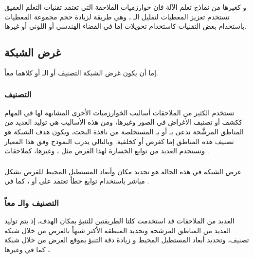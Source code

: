 \subsubsection{}
و كغيرها من نماذج تعلم الآلة فإن خوارزميات الملاحقة التي تعتمد تقنيات التعلم العميق تستخدم تعزيز المعطيات
 لتقليل الـ
،
 وهي طريقة لزيادة حجم مجموعة المعطيات باستخدام بعض التقنيات كاستخدام تحويلات إما في الفضاء الهندسي أو اللوني أو غيرها.
\subsection{غرض الشبكة}
إما أن يكون غرض الشبكة التصنيف 
 أو الـ 
 أو كلاهما معاً.

\subsubsection{التصنيف}
تستخدم الكثير من  الملاحقات أساليب الخوارزميات الأخرى المشابهة لها في  المهام ككشف أو تصنيف الأغراض في الصور وغيرها، ومن هذه الأساليب هي توليد العديد من المناطق المرشَّحة تدعى بـ
أو بـ
 المستخلصة من نافذة البحث، ويكون هدف الشبكة هو تصنيف هذه المناطق إما كغرض أو كخلفية. وبالتالي يدرب النموذج وفق هذا المعيار وتستخدم العديد من توابع الخسارة لهذا الغرض مثل 
،
وغيرها، كملاحقات 
.
\subsubsection{
}
غرض الشبكة في هذه الحالة هو تحديد مكان وأبعاد المستطيل المحيط للغرض بشكل مباشر باستخدام توابع خطأ تعتمد على
 أو
،
كما في 
.

\subsubsection{التصنيف والـ
معاً}
 العديد من الملاحقات  قد استخدمت كلتا الطريقتين للتنبؤ بمكان الهدف، إذ يتم توليد العديد من المناطق المرشحة وتحديد المنطقة الأكثر شبهاً بالغرض من خلال شبكة تصنيف، وتحديد أبعاد المستطيل المحيط و زيادة دقة التنبؤ بموقع الغرض من خلال شبكة 
،
كما في 
وغيرها.
